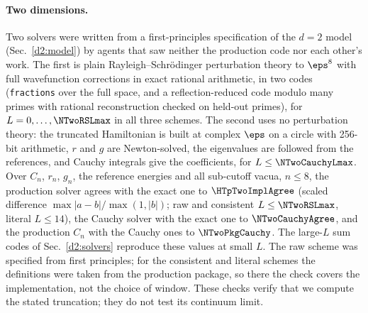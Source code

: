 \paragraph{Two dimensions.}\label{d2:checks}
Two solvers were written from a first-principles specification of the $d=2$ model (Sec.~\ref{d2:model}) by agents that saw
neither the production code nor each other's work. The first is plain Rayleigh--Schr\"odinger perturbation theory to $\eps^8$
with full wavefunction corrections in exact rational arithmetic, in two codes (\texttt{fractions} over the full space, and a
reflection-reduced code modulo many primes with rational reconstruction checked on held-out primes), for
$L=0,\dots,\NTwoRSLmax$ in all three schemes. The second uses no perturbation theory: the truncated Hamiltonian is built at
complex $\eps$ on a circle with 256-bit arithmetic, $r$ and $g$ are Newton-solved, the eigenvalues are followed from the
references, and Cauchy integrals give the coefficients, for $L\le\NTwoCauchyLmax$. Over $C_n$, $r_n$, $g_n$, the reference
energies and all sub-cutoff vacua, $n\le8$, the production solver agrees with the exact one to $\HTpTwoImplAgree$ (scaled
difference $\max|a-b|/\max(1,|b|)$; raw and consistent $L\le\NTwoRSLmax$, literal $L\le14$), the Cauchy solver with the exact one
to $\NTwoCauchyAgree$, and the production $C_n$ with the Cauchy ones to $\NTwoPkgCauchy$. The large-$L$ sum codes of
Sec.~\ref{d2:solvers} reproduce these values at small $L$. The raw scheme was specified from first principles; for the
consistent and literal schemes the definitions were taken from the production package, so there the check covers the
implementation, not the choice of window. These checks verify that we compute the stated truncation; they do not test its
continuum limit.

